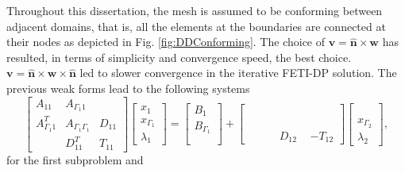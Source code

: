 Throughout this dissertation, the mesh is assumed to be conforming between adjacent domains, that is, all the elements at the boundaries are connected at their nodes as depicted in Fig. \ref{fig:DDConforming}. The choice of $\mathbf{v} = \hat{\mathbf{n}} \times \mathbf{w}$ has resulted, in terms of simplicity and convergence speed, the best choice. $\mathbf{v} = \hat{\mathbf{n}} \times \mathbf{w} \times \hat{\mathbf{n}}$ led to slower convergence in the iterative FETI-DP solution. The previous weak forms lead to the following systems
\begin{equation}
\label{eq:DDFETI1}
\begin{bmatrix}
A_{11} & A_{\Gamma_1 1} & \\
A_{\Gamma_1 1}^T & A_{\Gamma_1 \Gamma_1} & D_{11}\\
 & D_{11}^T  & T_{11}
\end{bmatrix}
\begin{bmatrix}
x_{1}\\
x_{\Gamma_1}\\
\lambda_{1}
\end{bmatrix}
=
\begin{bmatrix}
B_{1}\\
B_{\Gamma_1}\\
\phantom{x}
\end{bmatrix}
+
\begin{bmatrix}
\phantom{-}\phantom{A} & \phantom{-}\phantom{A} & \phantom{A}\\
\phantom{A} & \phantom{A} & \phantom{A}\\
\phantom{A} & D_{12}  & -T_{12}
\end{bmatrix}
\begin{bmatrix}
\phantom{A}\\
x_{\Gamma_2}\\
\lambda_{2}
\end{bmatrix},
\end{equation}
\noindent for the first subproblem and 
